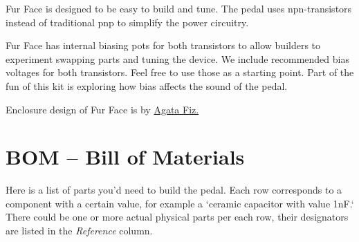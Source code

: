 \documentclass[a4paper,12pt]{article}
\begin{document}
Fur Face is designed to be easy to build and tune. The pedal
uses npn-transistors instead of traditional pnp to simplify
the power circuitry.

Fur Face has internal biasing pots for both transistors to
allow builders to experiment swapping parts and tuning the
device. We include recommended bias voltages for both
transistors. Feel free to use those as a starting point.
Part of the fun of this kit is exploring how bias affects
the sound of the pedal.

Enclosure design of Fur Face is by
\href{https://fiz.gallery/}{Agata Fiz.}

\pagebreak

\section{BOM – Bill of Materials}

Here is a list of parts you'd need to build the pedal.
Each row corresponds to a component with a certain value,
for example a `ceramic capacitor with value 1nF.` There could
be one or more actual physical parts per each row,
their designators are listed in the \textit{Reference}
column.
\end{document}
